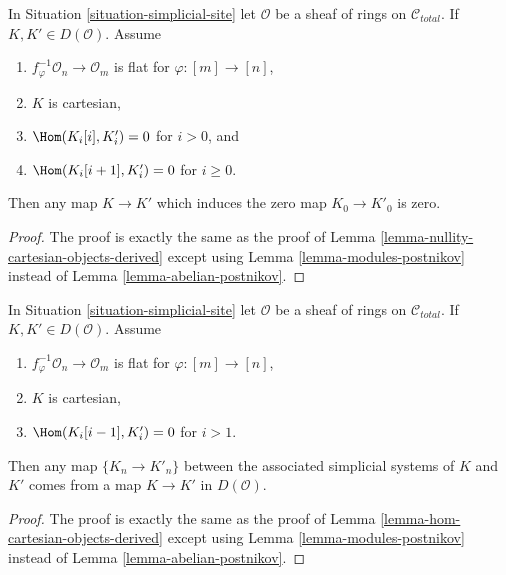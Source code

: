 \begin{lemma}
\label{lemma-nullity-cartesian-modules-derived}
In Situation \ref{situation-simplicial-site} let $\mathcal{O}$ be
a sheaf of rings on $\mathcal{C}_{total}$.
If $K, K' \in D(\mathcal{O})$.
Assume
\begin{enumerate}
\item $f_\varphi^{-1}\mathcal{O}_n \to \mathcal{O}_m$ is flat for
$\varphi : [m] \to [n]$,
\item $K$ is cartesian,
\item $\Hom(K_i[i], K'_i) = 0$ for $i > 0$, and
\item $\Hom(K_i[i + 1], K'_i) = 0$ for $i \geq 0$.
\end{enumerate}
Then any map $K \to K'$ which induces the zero map $K_0 \to K'_0$ is zero.
\end{lemma}

\begin{proof}
The proof is exactly the same as the proof of
Lemma \ref{lemma-nullity-cartesian-objects-derived} except using
Lemma \ref{lemma-modules-postnikov} instead of
Lemma \ref{lemma-abelian-postnikov}.
\end{proof}

\begin{lemma}
\label{lemma-hom-cartesian-modules-derived}
In Situation \ref{situation-simplicial-site} let $\mathcal{O}$ be
a sheaf of rings on $\mathcal{C}_{total}$.
If $K, K' \in D(\mathcal{O})$.
Assume
\begin{enumerate}
\item $f_\varphi^{-1}\mathcal{O}_n \to \mathcal{O}_m$ is flat for
$\varphi : [m] \to [n]$,
\item $K$ is cartesian,
\item $\Hom(K_i[i - 1], K'_i) = 0$ for $i > 1$.
\end{enumerate}
Then any map $\{K_n \to K'_n\}$ between the associated simplicial systems 
of $K$ and $K'$ comes from a map $K \to K'$ in $D(\mathcal{O})$.
\end{lemma}

\begin{proof}
The proof is exactly the same as the proof of
Lemma \ref{lemma-hom-cartesian-objects-derived} except using
Lemma \ref{lemma-modules-postnikov} instead of
Lemma \ref{lemma-abelian-postnikov}.
\end{proof}

